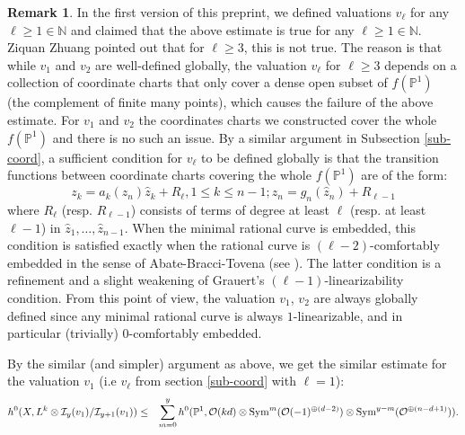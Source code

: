 \documentclass[12pt]{amsart}
\theoremstyle{definition}
\newtheorem{rmk}[thm]{Remark}
\def\sym{{\rm Sym}}
\newcommand{\IN}{{\mathbb N}}
\newcommand{\IP}{{\mathbb P}}
\newcommand{\CI}{{\mathcal I}}
\newcommand{\CO}{{\mathcal O}}
\begin{document}
\begin{rmk}\label{rmk-Zhuang}
    In the first version of this preprint, we defined valuations $v_\ell$ for any $\ell\ge 1 \in \IN$ and claimed that the above estimate is true for any $\ell\ge 1\in \IN$. Ziquan Zhuang pointed out that for $\ell \ge 3$, this is not true. The reason is that while $v_1$ and $v_2$ are well-defined globally, the valuation $v_\ell$ for $\ell \ge 3$ depends on a collection of coordinate charts that only cover a dense open subset of $f(\IP^1)$ (the complement of finite many points), which causes the failure of the above estimate. For $v_1$ and $v_2$ the coordinates charts we constructed cover the whole $f(\IP^1)$ and there is no such an issue. By a similar argument in Subsection \ref{sub-coord}, a sufficient condition for $v_\ell$ to be defined globally is that the transition functions between coordinate charts covering the whole $f(\IP^1)$ are of the form:
    \begin{equation*}
        z_k=a_k(\hat{z}_n)\hat{z}_k+R_{\ell}, 1\le k\le n-1; z_n=g_n(\hat{z}_n)+R_{\ell-1} 
    \end{equation*}
where $R_{\ell}$ (resp. $R_{\ell-1}$) consists of terms of degree at least $\ell$ (resp. at least $\ell-1$) in $\hat{z}_1,\dots, \hat{z}_{n-1}$. 
    When the minimal rational curve is embedded, this condition is satisfied exactly when the rational curve is $(\ell-2)$-comfortably embedded in the sense of Abate-Bracci-Tovena (see \cite[Remark 3.3]{ABT09}). The latter condition is a refinement and a slight weakening of Grauert's $(\ell-1)$-linearizability condition. From this point of view, the valuation $v_1$, $v_2$ are always globally defined since any minimal rational curve is always $1$-linearizable, and in particular (trivially) $0$-comfortably embedded. 

   
\end{rmk}
 By the similar (and simpler) argument as above, we get the similar estimate for the valuation $v_1$ (i.e $v_\ell$ from section \ref{sub-coord} with $\ell=1$):
    \begin{eqnarray*}
h^0(X, L^k\otimes \CI_y(v_1)/\CI_{y+1}(v_1))
    &\le & \sum_{m=0}^{y} h^0(\IP^1, \CO(kd)\otimes \sym^{m}(\CO(-1)^{\oplus (d-2)})\otimes \sym^{y-m}(\CO^{\oplus (n-d+1)})).
    \end{eqnarray*}
\end{document}

